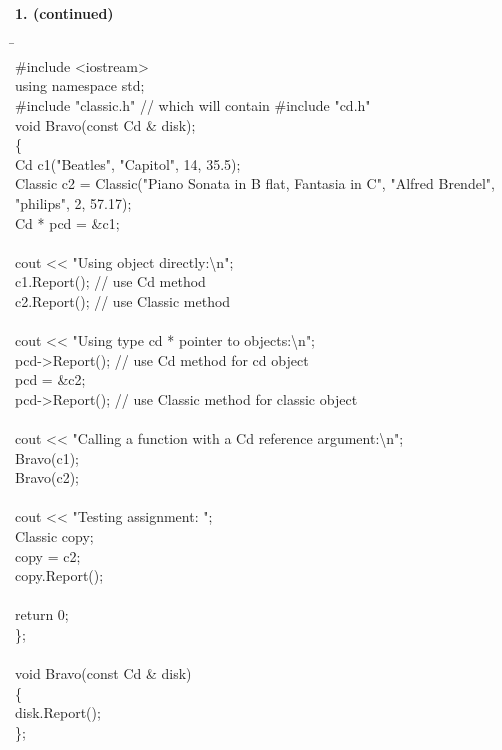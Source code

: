 \documentclass[10 pt]{amsart}
\newlength{\cwidth}
\newenvironment{cpartContinued}[2][\cwidth]
	{%
		\\ %
		\textbf{#2. (continued)}%
		\\
		\phantom{#2. }
		\begin{minipage}[t]{#1}%
		\setlength{\parindent}{0pt}%
		\setlength{\parskip}{2ex}%
	}
	{%
		\end{minipage}%
	}
\newcommand{\tbs}{\textbackslash}
\begin{document}
	\begin{cpartContinued}{1}
		{\ttfamily
			\begin{tabbing}
				\phantom{\qquad}\=\hspace{4cm}\= \\
				\#include <iostream> \\
				using namespace std; \\
				\#include "classic.h" \> \>
					// which will contain \#include "cd.h" \\
				void Bravo(const Cd \& disk); \\
				\{
				\+ \\
					Cd c1("Beatles", "Capitol", 14, 35.5); \\
					Classic c2 = 
						Classic("Piano Sonata in B flat, Fantasia in C", 
							"Alfred Brendel", "philips", 2, 57.17); \\
					Cd * pcd = \&c1; \\
					\\
					cout << "Using object directly:\tbs n"; \\
					c1.Report(); \> // use Cd method \\
					c2.Report(); \> // use Classic method \\
					\\
					cout << "Using type cd * pointer to objects:\tbs n"; \\
					pcd->Report(); \> // use Cd method for cd object \\
					pcd = \&c2; \\
					pcd->Report(); \> // use Classic method for 
						classic object \\
					\\
					cout << "Calling a function with a Cd reference 
								argument:\tbs n"; \\
					Bravo(c1); \\
					Bravo(c2); \\
					\\
					cout << "Testing assignment: "; \\
					Classic copy; \\
					copy = c2; \\
					copy.Report(); \\
					\\
					return 0; \\
				\< \}; \\
				\- \\
				void Bravo(const Cd \& disk) \\
				\{ \\
				\> disk.Report(); \\
				\};
			\end{tabbing}
		}
	\end{cpartContinued}
\end{document}
